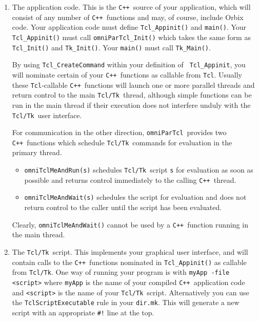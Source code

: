 \documentclass[11pt]{article}
\def\omniParTcl{{\tt omniParTcl}}
\def\tcltk{{\tt Tcl/Tk}}
\def\tcl{{\tt Tcl}}
\def\CXX{{\tt C++}}
\begin{document}
\begin{enumerate}

\item The application code.  This is the \CXX\ source of your
application, which will consist of any number of \CXX\ functions and
may, of course, include Orbix code.  Your application code must define
{\tt Tcl\_Appinit()} and {\tt main()}.  Your {\tt Tcl\_Appinit()} must
call {\tt omniParTcl\_Init()} which takes the same form as {\tt
Tcl\_Init()} and {\tt Tk\_Init()}.  Your {\tt main()} must call
{\tt Tk\_Main()}.

By using {\tt Tcl\_CreateCommand} within your definition of {\tt
Tcl\_Appinit}, you will nominate certain of your \CXX\ functions as
callable from \tcl.  Usually these \tcl-callable \CXX\ functions will
launch one or more parallel threads and return control to the main
\tcltk\ thread, although simple functions can be run in the main thread
if their execution does not interfere unduly with the \tcltk\ user
interface.

For communication in the other direction, \omniParTcl\ provides two
\CXX\ functions which schedule \tcltk\ commands for evaluation in the
primary thread.  

\begin{itemize}
\item
{\tt omniTclMeAndRun(s)} schedules \tcltk\ script {\tt s}
for evaluation as soon as possible and returns control
immediately to the calling \CXX\ thread.  
\item
{\tt omniTclMeAndWait(s)}
schedules the script for evaluation and does not return control to the
caller until the script has been evaluated.  
\end{itemize}

\noindent
Clearly, {\tt omniTclMeAndWait()} cannot be used by a
\CXX\ function running in the main thread.

\item

The \tcltk\ script.  This implements your graphical user interface, and will
contain calls to the \CXX\ functions nominated in {\tt Tcl\_Appinit()} as
callable from \tcltk.  One way of running your program is with {\tt myApp -file
<script>} where {\tt myApp} is the name of your compiled \CXX\ application code
and {\tt <script>} is the name of your \tcltk\ script.  Alternatively you can
use the {\tt TclScriptExecutable} rule in your {\tt dir.mk}.  This will
generate a new script with an appropriate \verb|#!| line at the top.

\end{enumerate}
\end{document}
